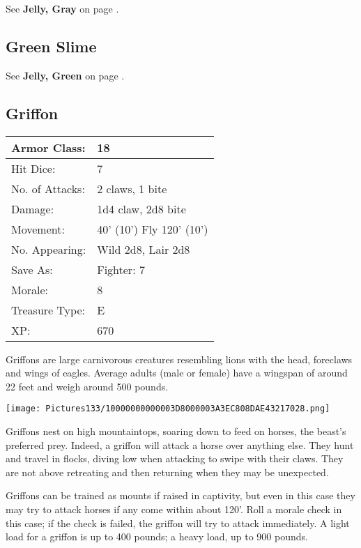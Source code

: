 \documentclass[a4paper,twoside,openany,10pt]{book}
\begin{document}
\begin{multicols}{2}
See \textbf{Jelly, Gray }on page \hyperlink{jelly-gray-gray-ooze}{\pageref{jelly-gray-gray-ooze}}.

\subsection*{Green Slime}\label{green-slime}

See \textbf{Jelly, Green} on page \hyperlink{jelly-green-green-slime}{\pageref{jelly-green-green-slime}}.

\subsection*{Griffon}\label{griffon}

\begin{tabularx}{0.48\textwidth}{@{}lX@{}}
Armor Class: & 18 \\\hline
Hit Dice: & 7 \\\hline
No. of Attacks: & 2 claws, 1 bite \\\hline
Damage: & 1d4 claw, 2d8 bite \\\hline
Movement: & 40' (10') Fly
120' (10') \\\hline
No. Appearing: & Wild 2d8, Lair 2d8 \\\hline
Save As: & Fighter: 7 \\\hline
Morale: & 8 \\\hline
Treasure Type: & E \\\hline
XP: & 670 \\\hline
\end{tabularx}\medskip

Griffons are large carnivorous creatures resembling lions with the head, foreclaws and wings of eagles. Average adults (male or female) have a wingspan of around 22 feet and weigh around 500 pounds.

\begin{center}
	\texttt{[image: Pictures133/10000000000003D8000003A3EC808DAE43217028.png]}
\end{center}

Griffons nest on high mountaintops, soaring down to feed on horses, the beast's preferred prey. Indeed, a griffon will attack a horse over anything else. They hunt and travel in flocks, diving low when attacking to swipe with their claws. They are not above retreating and then returning when they may be unexpected.

Griffons can be trained as mounts if raised in captivity, but even in this case they may try to attack horses if any come within about 120'. Roll a morale check in this case; if the check is failed, the griffon will try to attack immediately. A light load for a griffon is up to 400 pounds; a heavy load, up to 900 pounds.



\end{multicols}
\end{document}
